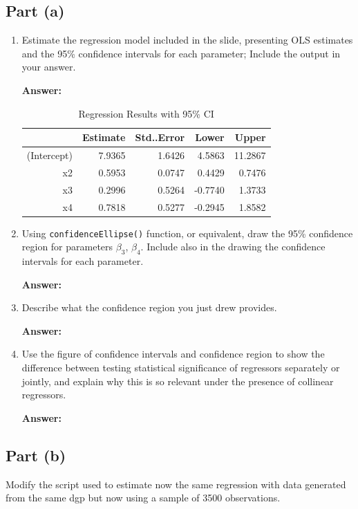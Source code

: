 \documentclass[12pt,a4paper]{article}
\begin{document}
\subsection*{Part (a)}
\begin{enumerate}[label=(\roman*)]
  \item Estimate the regression model included in the slide, presenting OLS estimates and the 95\% confidence intervals for each parameter; Include the output in your answer.
  
  \textbf{Answer:} 
 
\begin{table}[ht]
    \centering
    \caption{Regression Results with 95\% CI} 
    \label{tab:regression}
  \begin{tabular}{rrrrr}
    \hline
    & Estimate & Std..Error & Lower & Upper \\ 
    \hline
    (Intercept) & 7.9365 & 1.6426 & 4.5863 & 11.2867 \\ 
    x2 & 0.5953 & 0.0747 & 0.4429 & 0.7476 \\ 
    x3 & 0.2996 & 0.5264 & -0.7740 & 1.3733 \\ 
    x4 & 0.7818 & 0.5277 & -0.2945 & 1.8582 \\ 
    \hline
  \end{tabular}
\end{table}

  
  \item Using \texttt{confidenceEllipse()} function, or equivalent, draw the 95\% confidence region for parameters $\beta_3$, $\beta_4$. Include also in the drawing the confidence intervals for each parameter.
  
  \textbf{Answer:} 
  
  \item Describe what the confidence region you just drew provides.
  
  \textbf{Answer:} 
  
  \item Use the figure of confidence intervals and confidence region to show the difference between testing statistical significance of regressors separately or jointly, and explain why this is so relevant under the presence of collinear regressors.
  
  \textbf{Answer:} 
\end{enumerate}

\subsection*{Part (b)}
Modify the script used to estimate now the same regression with data generated from the same dgp but now using a sample of 3500 observations.
\end{document}
